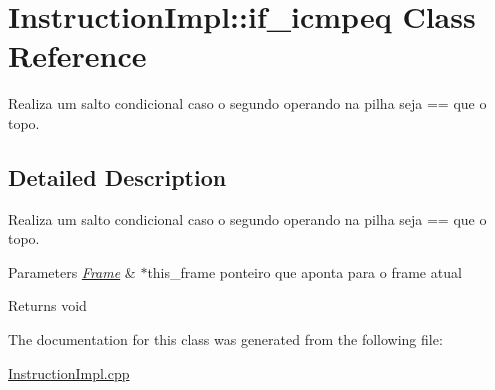\hypertarget{class_instruction_impl_1_1if__icmpeq}{}\section{Instruction\+Impl\+:\+:if\+\_\+icmpeq Class Reference}
\label{class_instruction_impl_1_1if__icmpeq}


Realiza um salto condicional caso o segundo operando na pilha seja == que o topo.  




\subsection{Detailed Description}
Realiza um salto condicional caso o segundo operando na pilha seja == que o topo. 


\begin{DoxyParams}{Parameters}
{\em \hyperlink{struct_frame}{Frame}} & $\ast$this\+\_\+frame ponteiro que aponta para o frame atual \\
\hline
\end{DoxyParams}
\begin{DoxyReturn}{Returns}
void 
\end{DoxyReturn}


The documentation for this class was generated from the following file\+:\begin{DoxyCompactItemize}
\item 
\hyperlink{_instruction_impl_8cpp}{Instruction\+Impl.\+cpp}\end{DoxyCompactItemize}
